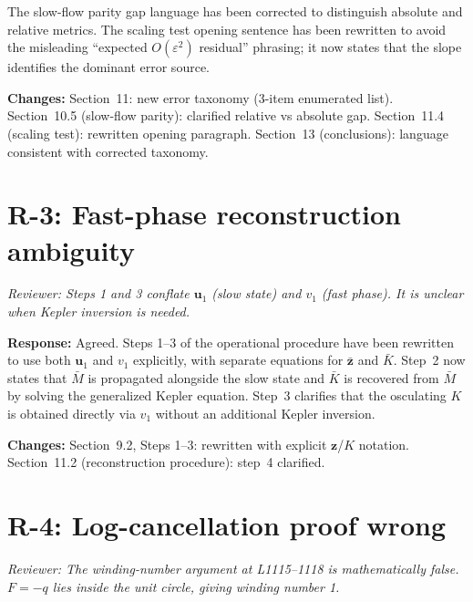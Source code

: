 \documentclass[11pt]{article}
\newcommand{\rev}[1]{\textcolor{revcolor}{\emph{#1}}}
\begin{document}
The slow-flow parity gap language has been corrected to distinguish absolute
and relative metrics. The scaling test opening sentence has been rewritten
to avoid the misleading ``expected $O(\varepsilon^2)$ residual'' phrasing;
it now states that the slope identifies the dominant error source.

\textbf{Changes:} Section~11: new error taxonomy (3-item enumerated list).
Section~10.5 (slow-flow parity): clarified relative vs absolute gap.
Section~11.4 (scaling test): rewritten opening paragraph.
Section~13 (conclusions): language consistent with corrected taxonomy.

\section*{R-3: Fast-phase reconstruction ambiguity}

\rev{Reviewer: Steps 1 and 3 conflate $\bm{u}_1$ (slow state) and $v_1$
(fast phase). It is unclear when Kepler inversion is needed.}

\textbf{Response:} Agreed. Steps 1--3 of the operational procedure have been
rewritten to use both $\bm{u}_1$ and $v_1$ explicitly, with separate
equations for $\bar{\bm{z}}$ and $\bar K$. Step~2 now states that
$\bar M$ is propagated alongside the slow state and $\bar K$ is recovered
from $\bar M$ by solving the generalized Kepler equation. Step~3 clarifies
that the osculating $K$ is obtained directly via $v_1$ without an additional
Kepler inversion.

\textbf{Changes:} Section~9.2, Steps 1--3: rewritten with explicit
$\bm{z}$/$K$ notation. Section~11.2 (reconstruction procedure): step~4
clarified.

\section*{R-4: Log-cancellation proof wrong}

\rev{Reviewer: The winding-number argument at L1115--1118 is mathematically
false. $F = -q$ lies inside the unit circle, giving winding number 1.}
\end{document}
